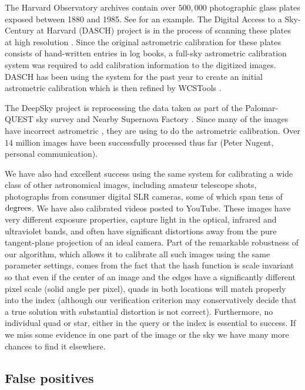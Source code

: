 The Harvard Observatory archives contain over $500,000$ photographic
glass plates exposed between 1880 and 1985.  See 
for an example.  The Digital Access to a Sky-Century at Harvard (DASCH)
project is in the process of scanning these plates at high
resolution \cite{harvardplates,dasch}.  Since the original astrometric
calibration for these plates consists of hand-written entries in log
books, a full-sky astrometric calibration system was required to add
calibration information to the digitized images.  DASCH has been using
the \an system for the past year to create an initial astrometric
calibration which is then refined by WCSTools \cite{wcstools4}.


The DeepSky project \cite{deepsky} is reprocessing the data taken as
part of the Palomar-QUEST sky survey and Nearby Supernova
Factory \cite{palomarquest, nearbysnfactory}.  Since many of the images
have incorrect astrometric \metadata, they are using \an to do the
astrometric calibration.  Over $14$ million images have been
successfully processed thus far (Peter Nugent, personal
communication).


We have also had excellent success using the same system for
calibrating a wide class of other astronomical images, including
amateur telescope shots, photographs from consumer digital SLR
cameras, some of which span tens of $\mathrm{degrees}$.  We have also
calibrated videos posted to YouTube.  These images have very different
exposure properties, capture light in the optical, infrared and
ultraviolet bands, and often have significant distortions away from
the pure tangent-plane projection of an ideal camera.  Part of the
remarkable robustness of our algorithm, which allows it to calibrate
all such images using the same parameter settings, comes from the fact
that the hash function is scale invariant so that even if the center
of an image and the edges have a significantly different pixel scale
(solid angle per pixel), quads in both locations will match properly
into the index (although our verification criterion may conservatively
decide that a true solution with substantial distortion is not
correct). Furthermore, no individual quad or star, either in the query
or the index is essential to success. If we miss some evidence in one
part of the image or the sky we have many more chances to find it
elsewhere.


\subsection{False positives}


